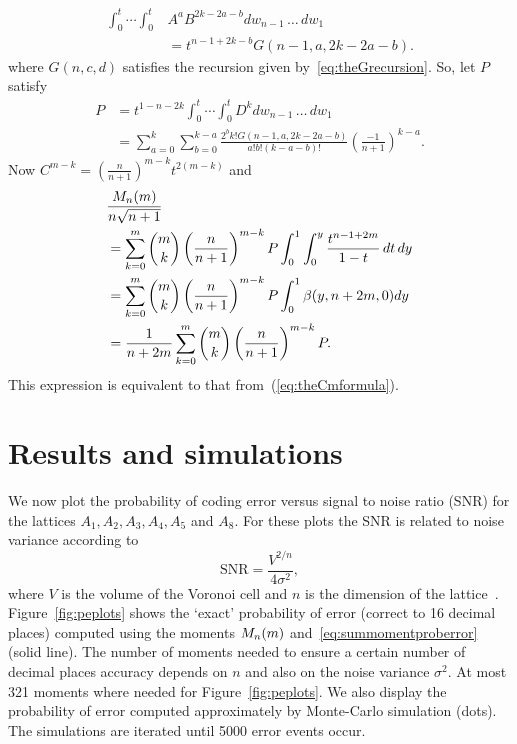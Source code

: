\documentclass[journal]{IEEEtran}
\begin{document}
\begin{equation} \label{eq:recurseint}
\begin{split}
  \int_0^t \cdots \int_0^t &A^{a} B^{2k-2a-b} dw_{n-1} \, \dots \, dw_1 \\
&= t^{n-1+2k - b} G(n-1,a,2k - 2a - b).
\end{split}
\end{equation}
where $G(n,c,d)$ satisfies the recursion given by~\eqref{eq:theGrecursion}.  So, let $P$ satisfy
\begin{align*}
P &= t^{1 - n - 2k}\int_0^t \cdots \int_0^t D^k dw_{n-1} \, \dots \, dw_1 \\
&= \sum_{a=0}^k\sum_{b=0}^{k-a} \frac{2^{b} k!G(n-1,a,2k - 2a - b)}{a! b! (k-a-b)!} \left(\frac{-1}{n+1}\right)^{k - a}.
\end{align*}
Now $C^{m-k} = \left(\frac{n}{n+1} \right)^{m-k} t^{2(m-k)}$ and
\begin{align*}
&\frac{M_n(m)}{n\sqrt{n+1}} \\
&= \sum_{k=0}^{m} \binom{m}{k} \left(\frac{n}{n+1} \right)^{m-k} P \int_0^1 \int_0^y \frac{t^{n - 1 + 2m}}{1 - t} \, dt \, dy \\
&= \sum_{k=0}^{m} \binom{m}{k} \left(\frac{n}{n+1} \right)^{m-k} P \int_0^1 \beta(y,n+2m,0) dy \\
&= \frac{1}{n+2m} \sum_{k=0}^{m} \binom{m}{k} \left(\frac{n}{n+1} \right)^{m-k} P.
\end{align*}
This expression is equivalent to that from~(\ref{eq:theCmformula}).


\section{Results and simulations}\label{sec:results-simulations}

We now plot the probability of coding error versus signal to noise ratio (SNR) for the lattices $A_1, A_2, A_3, A_4, A_5$ and $A_8$.  For these plots the SNR is related to noise variance according to
\[
\text{SNR} = \frac{V^{2/n}}{4\sigma^2},
\]
where $V$ is the volume of the Voronoi cell and $n$ is the dimension of the lattice~\cite[p. 167]{Viterbo_diamond_cutting_1996}.  Figure~\ref{fig:peplots} shows the `exact' probability of error (correct to 16 decimal places) computed using the moments $M_n(m)$ and~\eqref{eq:summomentproberror} (solid line).  The number of moments needed to ensure a certain number of decimal places accuracy depends on $n$ and also on the noise variance $\sigma^2$.  At most 321 moments where needed for Figure~\ref{fig:peplots}.  We also display the probability of error computed approximately by Monte-Carlo simulation (dots).  %
The simulations are iterated until 5000 error events occur.
\end{document}
